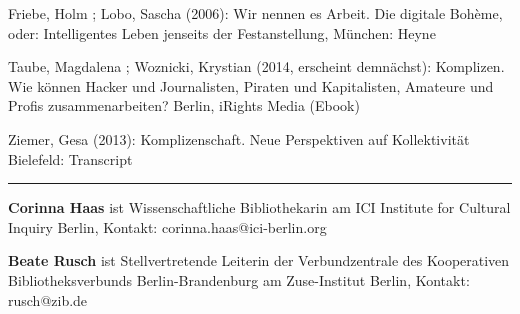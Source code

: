 \documentclass[a4paper,
fontsize=11pt,
oneside,
numbers=noperiodatend,
parskip=half-,
bibliography=totoc,
final
]{scrartcl}
\begin{document}
Friebe, Holm ; Lobo, Sascha (2006): Wir nennen es Arbeit. Die digitale
Bohème, oder: Intelligentes Leben jenseits der Festanstellung, München:
Heyne

Taube, Magdalena ; Woznicki, Krystian (2014, erscheint demnächst):
Komplizen. Wie können Hacker und Journalisten, Piraten und Kapitalisten,
Amateure und Profis zusammenarbeiten? Berlin, iRights Media (Ebook)

Ziemer, Gesa (2013): Komplizenschaft. Neue Perspektiven auf
Kollektivität Bielefeld: Transcript

\begin{center}\rule{3in}{0.4pt}\end{center}

\textbf{Corinna Haas} ist Wissenschaftliche Bibliothekarin am ICI
Institute for Cultural Inquiry Berlin, Kontakt:
corinna.haas@ici-berlin.org

\textbf{Beate Rusch} ist Stellvertretende Leiterin der Verbundzentrale
des Kooperativen Bibliotheksverbunds Berlin-Brandenburg am Zuse-Institut
Berlin, Kontakt: rusch@zib.de
\end{document}
